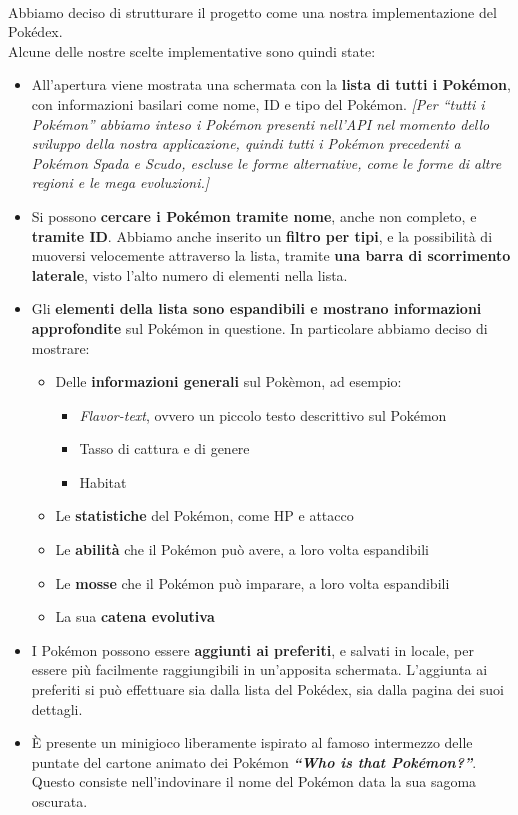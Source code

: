 \documentclass[a4paper,11pt]{article}
\begin{document}
  		\paragraph{}
  			Abbiamo deciso di strutturare il progetto come una nostra implementazione del Pokédex. \\ 
Alcune delle nostre scelte implementative sono quindi state:
		\begin{itemize}
			\item All’apertura viene mostrata una schermata con la \textbf{lista di tutti i Pokémon}, con informazioni basilari come nome, ID e tipo del Pokémon. \textit{[Per “tutti i Pokémon” abbiamo inteso i Pokémon presenti nell’API nel momento dello sviluppo della nostra applicazione, quindi tutti i Pokémon precedenti a Pokémon Spada e Scudo, escluse le forme alternative, come le forme di altre regioni e le mega evoluzioni.]}
			\item Si possono \textbf{cercare i Pokémon tramite nome}, anche non completo, e \textbf{tramite ID}. Abbiamo anche inserito un \textbf{filtro per tipi}, e la possibilità di muoversi velocemente attraverso la lista, tramite \textbf{una barra di scorrimento laterale}, visto l’alto numero di elementi nella lista.
			\item Gli \textbf{elementi della lista sono espandibili e mostrano informazioni approfondite} sul Pokémon in questione. In particolare abbiamo deciso di mostrare:
				\begin{itemize}
					\item Delle \textbf{informazioni generali} sul Pokèmon, ad esempio:
						\begin{itemize}
							\item \textit{Flavor-text}, ovvero un piccolo testo descrittivo sul Pokémon
							\item Tasso di cattura e di genere
							\item Habitat
						\end{itemize}
					\item Le \textbf{statistiche} del Pokémon, come HP e attacco
					\item Le \textbf{abilità} che il Pokémon può avere, a loro volta espandibili
					\item Le \textbf{mosse} che il Pokémon può imparare, a loro volta espandibili	
					\item La sua \textbf{catena evolutiva}
				\end{itemize}
			\item I Pokémon possono essere \textbf{aggiunti ai preferiti}, e salvati in locale, per essere più facilmente raggiungibili in un’apposita schermata. L’aggiunta ai preferiti si può effettuare sia dalla lista del Pokédex, sia dalla pagina dei suoi dettagli.
			\item È presente un minigioco liberamente ispirato al famoso intermezzo delle puntate del cartone animato dei Pokémon \textbf{\textit{“Who is that Pokémon?”}}. Questo consiste nell’indovinare il nome del Pokémon data la sua sagoma oscurata.
		\end{itemize}\newpage
\end{document}
